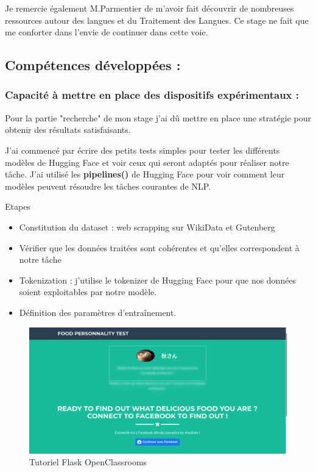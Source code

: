 \documentclass[12pt]{article}
\begin{document}
Je remercie également M.Parmentier de m'avoir fait découvrir de  nombreuses ressources autour des langues et du Traitement des Langues. Ce stage ne fait que me conforter dans l'envie de continuer dans cette voie. 

\subsection{Compétences développées :}

\subsubsection{Capacité à mettre en place des dispositifs expérimentaux :}

Pour la partie "recherche" de mon stage j'ai dû mettre en place une stratégie pour obtenir des résultats satisfaisants. 

J'ai commencé par écrire des petits tests simples pour tester les différents modèles de Hugging Face et voir ceux qui seront adaptés pour réaliser notre tâche. J'ai utilisé les \textbf{pipelines()} de Hugging Face pour voir comment leur modèles peuvent résoudre les tâches courantes de NLP. 

Etapes 

\begin{itemize}
    \item Constitution du dataset : web scrapping sur WikiData et Gutenberg
    
    \item Vérifier que les données traitées sont cohérentes et qu'elles correspondent à notre tâche
    
    \item Tokenization : j'utilise le tokenizer de Hugging Face pour que nos données soient exploitables par notre modèle. 
    
    \item Définition des paramètres d'entraînement. 
\end{itemize}


\newpage



\begin{figure}
    \centering
    \includegraphics[scale=0.27]{tuto_OC.png}
    \caption{Tutoriel Flask OpenClassrooms}
    \label{fig:tuto_OC}
\end{figure}
\end{document}
